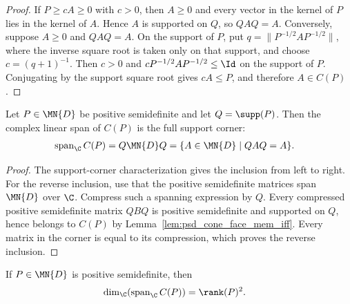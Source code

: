 \begin{proof}\leanok
    If $P\ge cA\ge0$ with $c>0$, then $A\ge0$ and every vector in the kernel of
    $P$ lies in the kernel of $A$. Hence $A$ is supported on $Q$, so $QAQ=A$.
    Conversely, suppose $A\ge0$ and $QAQ=A$. On the support of $P$, put
    $q=\lVert P^{-1/2}AP^{-1/2}\rVert$, where the inverse square root is taken
    only on that support, and choose $c=(q+1)^{-1}$. Then $c>0$ and
    $cP^{-1/2}AP^{-1/2}\le\Id$ on the support of $P$. Conjugating by the support
    square root gives $cA\le P$, and therefore $A\in C(P)$.
\end{proof}

\begin{theorem}
    \label{thm:psd_cone_face_span}
    \leanok
    Let $P\in\MN{D}$ be positive semidefinite and let $Q=\supp(P)$. Then the
    complex linear span of $C(P)$ is the full support corner:
    \begin{align}
        \operatorname{span}_{\C} C(P)
         & =Q\MN{D}Q
          =\{A\in\MN{D}\mid QAQ=A\}.
        \notag
    \end{align}
\end{theorem}

\begin{proof}\leanok
    The support-corner characterization gives the inclusion from left to right.
    For the reverse inclusion, use that the positive semidefinite matrices span
    $\MN{D}$ over $\C$. Compress such a spanning expression by $Q$. Every
    compressed positive semidefinite matrix $QBQ$ is positive semidefinite and
    supported on $Q$, hence belongs to $C(P)$ by
    Lemma~\ref{lem:psd_cone_face_mem_iff}. Every matrix in the corner is equal
    to its compression, which proves the reverse inclusion.
\end{proof}

\begin{corollary}
    \label{cor:psd_cone_face_span_dimension}
    \leanok
    If $P\in\MN{D}$ is positive semidefinite, then
    \begin{align}
        \dim_{\C}\!\left(\operatorname{span}_{\C} C(P)\right)
         & =\rank(P)^2.
        \notag
    \end{align}
\end{corollary}

